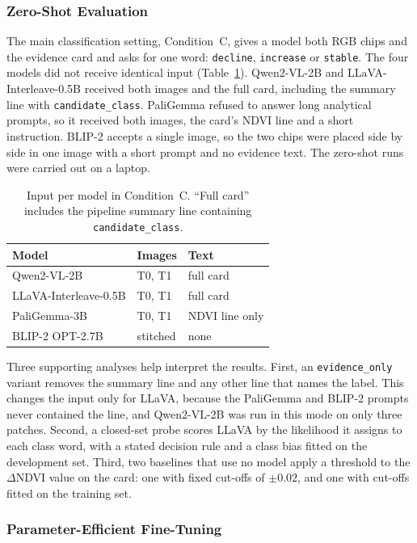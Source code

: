 \documentclass[11pt]{article}
\begin{document}
\subsubsection{Zero-Shot Evaluation}

The main classification setting, Condition~C, gives a model both RGB
chips and the evidence card and asks for one word: \texttt{decline},
\texttt{increase} or \texttt{stable}. The four models did not receive
identical input (Table~\ref{tab:inputs}). Qwen2-VL-2B and
LLaVA-Interleave-0.5B received both images and the full card, including
the summary line with \texttt{candidate\_class}. PaliGemma refused to
answer long analytical prompts, so it received both images, the card's
NDVI line and a short instruction. BLIP-2 accepts a single image, so the
two chips were placed side by side in one image with a short prompt and
no evidence text. The zero-shot runs were carried out on a laptop.

\begin{table}[t]
\centering
\small
\begin{tabular}{lll}
\toprule
Model & Images & Text \\
\midrule
Qwen2-VL-2B & T0, T1 & full card \\
LLaVA-Interleave-0.5B & T0, T1 & full card \\
PaliGemma-3B & T0, T1 & NDVI line only \\
BLIP-2 OPT-2.7B & stitched & none \\
\bottomrule
\end{tabular}
\caption{Input per model in Condition~C. ``Full card'' includes the
pipeline summary line containing \texttt{candidate\_class}.}
\label{tab:inputs}
\end{table}

Three supporting analyses help interpret the results. First, an
\texttt{evidence\_only} variant removes the summary line and any other
line that names the label. This changes the input only for LLaVA,
because the PaliGemma and BLIP-2 prompts never contained the line, and
Qwen2-VL-2B was run in this mode on only three patches. Second, a
closed-set probe scores LLaVA by the likelihood it assigns to each class
word, with a stated decision rule and a class bias fitted on the
development set. Third, two baselines that use no model apply a
threshold to the $\Delta$NDVI value on the card: one with fixed cut-offs
of $\pm 0.02$, and one with cut-offs fitted on the training set.

\subsubsection{Parameter-Efficient Fine-Tuning}
\end{document}
